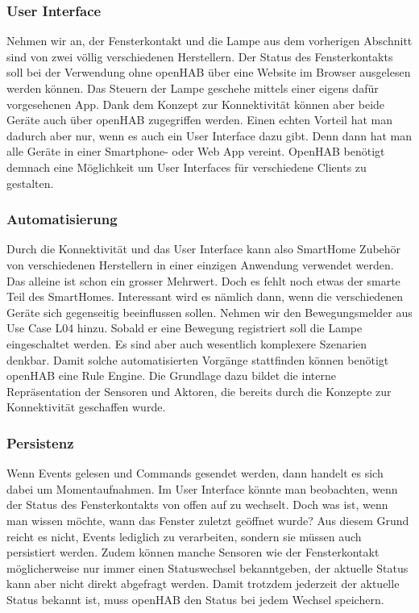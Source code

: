 \subsubsection{User Interface}
Nehmen wir an, der Fensterkontakt und die Lampe aus dem vorherigen Abschnitt sind von zwei völlig verschiedenen Herstellern. Der Status des Fensterkontakts soll bei der Verwendung ohne openHAB über eine Website im Browser ausgelesen werden können. Das Steuern der Lampe geschehe mittels einer eigens dafür vorgesehenen App. Dank dem Konzept zur Konnektivität können aber beide Geräte auch über openHAB zugegriffen werden. Einen echten Vorteil hat man dadurch aber nur, wenn es auch ein User Interface dazu gibt. Denn dann hat man alle Geräte in einer Smartphone- oder Web App vereint. OpenHAB benötigt demnach eine Möglichkeit um User Interfaces für verschiedene Clients zu gestalten.

\subsubsection{Automatisierung}
Durch die Konnektivität und das User Interface kann also SmartHome Zubehör von verschiedenen Herstellern in einer einzigen Anwendung verwendet werden. Das alleine ist schon ein grosser Mehrwert. Doch es fehlt noch etwas der smarte Teil des SmartHomes. Interessant wird es nämlich dann, wenn die verschiedenen Geräte sich gegenseitig beeinflussen sollen. Nehmen wir den Bewegungsmelder aus Use Case L04 hinzu. Sobald er eine Bewegung registriert soll die Lampe eingeschaltet werden. Es sind aber auch wesentlich komplexere Szenarien denkbar. Damit solche automatisierten Vorgänge stattfinden können benötigt openHAB eine Rule Engine. Die Grundlage dazu bildet die interne Repräsentation der Sensoren und Aktoren, die bereits durch die Konzepte zur Konnektivität geschaffen wurde.

\subsubsection{Persistenz}
Wenn Events gelesen und Commands gesendet werden, dann handelt es sich dabei um Momentaufnahmen. Im User Interface könnte man beobachten, wenn der Status des Fensterkontakts von offen auf zu wechselt. Doch was ist, wenn man wissen möchte, wann das Fenster zuletzt geöffnet wurde? Aus diesem Grund reicht es nicht, Events lediglich zu verarbeiten, sondern sie müssen auch persistiert werden. Zudem können manche Sensoren wie der Fensterkontakt möglicherweise nur immer einen Statuswechsel bekanntgeben, der aktuelle Status kann aber nicht direkt abgefragt werden. Damit trotzdem jederzeit der aktuelle Status bekannt ist, muss openHAB den Status bei jedem Wechsel speichern. 


